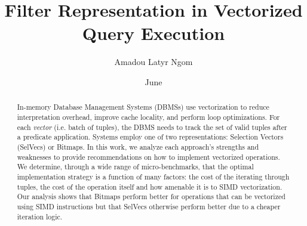 \documentclass[12pt]{cmuthesis}
\begin{document}
 
\frontmatter

\pagestyle{empty}

\title{ %
{\bf Filter Representation in Vectorized Query Execution}}
\author{Amadou Latyr Ngom}
\date{June}
\trnumber{}


\support{}
\disclaimer{}



\maketitle

\begin{dedication}
\end{dedication}

\pagestyle{plain} %


\begin{abstract}
In-memory Database Management Systems (DBMSs) use vectorization to reduce interpretation overhead, improve cache locality, and perform loop optimizations. For each \textit{vector} (i.e. batch of tuples), the DBMS needs to track the set of valid tuples after a predicate application. Systems employ one of two representations: Selection Vectors (SelVecs) or Bitmaps. In this work, we analyze each approach's strengths and weaknesses to provide recommendations on how to implement vectorized operations. We determine, through a wide range of micro-benchmarks, that the optimal implementation strategy is a function of many factors: the cost of the iterating through tuples, the cost of the operation itself and how amenable it is to SIMD vectorization. Our analysis shows that Bitmaps perform better for operations that can be vectorized using SIMD instructions but that SelVecs otherwise perform better due to a cheaper iteration logic.
\end{abstract}
\end{document}
